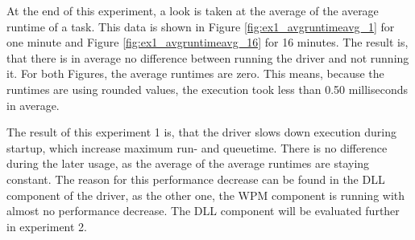 At the end of this experiment, a look is taken at the average of the average runtime of a task. This data is shown in Figure \ref{fig:ex1_avgruntimeavg_1} for one minute and Figure \ref{fig:ex1_avgruntimeavg_16} for 16 minutes. The result is, that there is in average no difference between running the driver and not running it. For both Figures, the average runtimes are zero. This means, because the runtimes are using rounded values, the execution took less than 0.50 milliseconds in average.

\medskip

The result of this experiment 1 is, that the driver slows down execution during startup, which increase maximum run- and queuetime. There is no difference during the later usage, as the average of the average runtimes are staying constant. The reason for this performance decrease can be found in the \gls{DLL} component of the driver, as the other one, the \gls{WPM} component is running with almost no performance decrease. The \gls{DLL} component will be evaluated further in experiment 2.